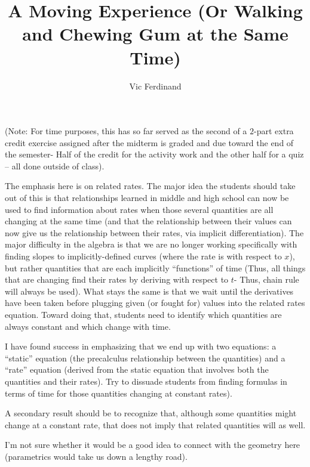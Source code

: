 \documentclass{ximera}
\author{Vic Ferdinand}
\title{A Moving Experience (Or Walking and Chewing Gum at the Same Time)}
\begin{document}
\begin{abstract}
\end{abstract}
\maketitle

\begin{instructorIntro}
(Note: For time purposes, this has so far served as the second of a $2$-part extra credit exercise assigned after the midterm is graded and due toward the end of the semester- Half of the credit for the activity work and the other half for a quiz – all done outside of class).

The emphasis here is on related rates.  The major idea the students should take out of this is that relationships learned in middle and high school can now be used to find information about rates when those several quantities are all changing at the same time (and that the relationship between their values can now give us the relationship between their rates, via implicit differentiation).  The major difficulty in the algebra is that we are no longer working specifically with finding slopes to implicitly-defined curves (where the rate is with respect to $x$), but rather quantities that are each implicitly ``functions'' of time (Thus, all things that are changing find their rates by deriving with respect to $t$- Thus, chain rule will always be used).  What stays the same is that we wait until the derivatives have been taken before plugging given (or fought for) values into the related rates equation.  Toward doing that, students need to identify which quantities are always constant and which change with time.  

I have found success in emphasizing that we end up with two equations:  a ``static'' equation (the precalculus relationship between the quantities) and a ``rate'' equation (derived from the static equation that involves both the quantities and their rates).  Try to dissuade students from finding formulas in terms of time for those quantities changing at constant rates).

A secondary result should be to recognize that, although some quantities might change at a constant rate, that does not imply that related quantities will as well.

I'm not sure whether it would be a good idea to connect with the geometry here (parametrics would take us down a lengthy road).

\end{instructorIntro}
\end{document}
